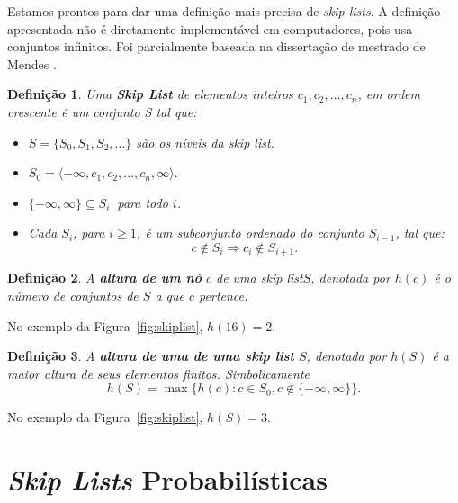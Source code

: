 \documentclass[paper=a4, fontsize=11pt]{scrartcl} %
\newtheorem{definition}{Definição}
\numberwithin{equation}{section}
\numberwithin{figure}{section}
\numberwithin{table}{section}
\numberwithin{definition}{section}
\numberwithin{theorem}{section}
\numberwithin{property}{section}
\numberwithin{proposition}{section}
\newcommand{\SLs}{\textit{Skip Lists}\xspace}
\newcommand{\sls}{\textit{skip lists}\xspace}
\renewcommand{\sl}{\textit{skip list}\xspace}
\begin{document}
Estamos prontos para dar uma definição mais precisa de \sls. A definição apresentada não é 
diretamente implementável em computadores, pois usa conjuntos infinitos. Foi
parcialmente baseada na dissertação de mestrado de Mendes \cite{mendes2008estruturas}.

\begin{definition}
Uma \textbf{\emph{Skip List}} de elementos inteiros $c_1, c_2, \ldots, c_n$, 
em ordem crescente é um conjunto S tal que:

\begin{itemize}

\item $S = \{S_0, S_1, S_2, \ldots \}$ são os níveis da \sl.

\item $S_0 = \langle -\infty, c_1, c_2, \ldots, c_n, \infty \rangle.$

\item $\{-\infty, \infty\} \subseteq S_i \ $ para todo $i$.

\item Cada $S_i$, para $i \geq 1$, é um subconjunto ordenado do conjunto $S_{i-1}$, tal que:
$$
c \notin S_i \Rightarrow c_i \notin S_{i + 1}.
$$

\end{itemize}

\end{definition}


\begin{definition}

A \textbf{altura de um nó} $c$ de uma \sl $S$, denotada por $h(c)$ é o número de conjuntos de $S$ 
a que $c$ pertence.

\end{definition}

No exemplo da Figura~\ref{fig:skiplist}, $h(16) = 2$.

\begin{definition}

A \textbf{altura de uma de uma \sl} $S$, denotada por $h(S)$ é a maior altura de seus elementos finitos.
Simbolicamente
$$
h(S) = \max \{ h(c) : c \in S_0, c \notin \{ -\infty, \infty \} \}.
$$

\end{definition}

No exemplo da Figura~\ref{fig:skiplist}, $h(S) = 3$.


\pagebreak
\section{\SLs Probabilísticas}
\FloatBarrier
\end{document}
